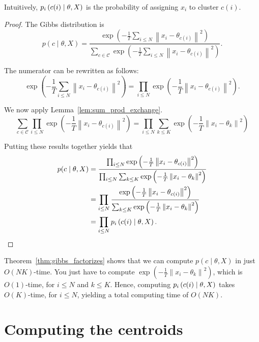 Intuitively, $p_{i} \left(c(i)\mid \theta, X\right)$ is the probability of assigning $x_i$ to cluster $c(i)$.

\begin{proof}
The Gibbs distribution is
%
\begin{equation}
p(c \mid \theta, X) = \frac{\exp\left(- \frac{1}{T}\sum_{i \leq N}\left\|x_i - \theta_{c(i)}\right\|^2\right)}{\sum_{c \in \mathcal{C}}\exp\left(- \frac{1}{T}\sum_{i \leq N}\left\|x_i - \theta_{c(i)}\right\|^2\right)}.
\end{equation}

The numerator can be rewritten as follows:
%
\begin{equation}
\exp\left(- \frac{1}{T}\sum_{i \leq N}\left\|x_i - \theta_{c(i)}\right\|^2\right) = \prod_{i \leq N}\exp\left(- \frac{1}{T}\left\|x_i - \theta_{c(i)}\right\|^2\right).
\end{equation}

We now apply Lemma~\ref{lem:sum_prod_exchange}.
%
\begin{equation}
\sum_{c \in \mathcal{C}} \prod_{i \leq N}\exp\left(- \frac{1}{T}\left\|x_i - \theta_{c(i)}\right\|^2\right) = \prod_{i \leq N} \sum_{k \leq K} \exp\left(- \frac{1}{T}\left\|x_i - \theta_{k}\right\|^2\right)
\end{equation}

Putting these results together yields that
%
\begin{align}
p(c \mid \theta, X) &= \frac{\prod_{i \leq N}\exp\left(- \frac{1}{T}\left\|x_i - \theta_{c(i)}\right\|^2\right)}{\prod_{i \leq N}\sum_{k \leq K}\exp\left(- \frac{1}{T}\left\|x_i - \theta_{k}\right\|^2\right)}\\
&= \prod_{i \leq N}\frac{\exp\left(- \frac{1}{T}\left\|x_i - \theta_{c(i)}\right\|^2\right)}{\sum_{k \leq K}\exp\left(- \frac{1}{T}\left\|x_i - \theta_{k}\right\|^2\right)}\\
&= \prod_{i \leq N}p_{i} \left(c(i)\mid \theta, X\right).
\end{align}
\end{proof} 

Theorem~\ref{thm:gibbs_factorizes} shows that we can compute $p(c \mid \theta, X)$ in just $O(NK)$-time.
You just have to compute $\exp\left(- \frac{1}{T}\left\|x_i - \theta_k\right\|^2\right)$, which is $O(1)$-time, for $i \leq N$ and $k \leq K$. Hence, computing $p_{i} \left(c(i)\mid \theta, X\right)$ takes $O(K)$-time, for $i \leq N$, yielding a total computing time of $O(NK)$.

\section{Computing the centroids}
\label{sec:computing_centroids_da}

